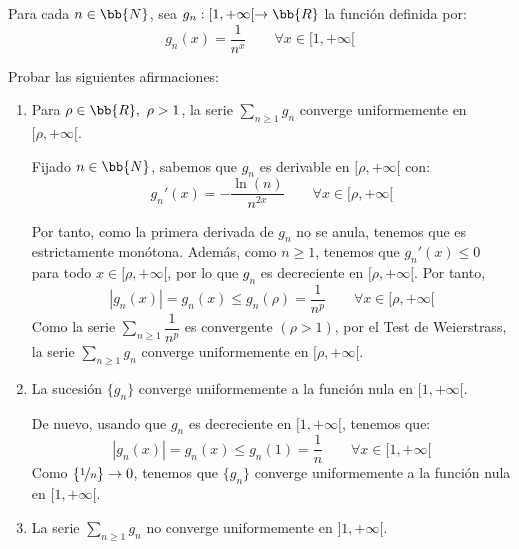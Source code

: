 \begin{ejercicio}
    Para cada $n\in \bb{N}$, sea $g_n:[1, +\infty[ \to\bb{R}$ la función definida por:
    \begin{equation*}
        g_n(x) = \frac{1}{n^x} \qquad \forall x\in[1, +\infty[
    \end{equation*}

    Probar las siguientes afirmaciones:
    \begin{enumerate}
        \item Para $\rho \in \bb{R},~\rho > 1$, la serie $\sum\limits_{n\geq 1}g_n$ converge uniformemente en $[\rho, +\infty[$.
        
        Fijado $n\in \bb{N}$, sabemos que $g_n$ es derivable en $[\rho, +\infty[$ con:
        \begin{equation*}
            g_n'(x) = -\frac{\ln(n)}{n^{2x}} \qquad \forall x\in[\rho, +\infty[
        \end{equation*}

        Por tanto, como la primera derivada de $g_n$ no se anula, tenemos que es estrictamente monótona. Además,
        como $n\geq 1$, tenemos que $g_n'(x) \leq 0$ para todo $x\in[\rho, +\infty[$, por lo que $g_n$ es decreciente en $[\rho, +\infty[$. Por tanto,
        \begin{equation*}
            |g_n(x)| = g_n(x) \leq g_n(\rho) = \frac{1}{n^p} \qquad \forall x\in[\rho, +\infty[
        \end{equation*}
        Como la serie $\sum\limits_{n\geq 1}\dfrac{1}{n^p}$ es convergente $\left(\rho > 1\right)$, por el Test de Weierstrass, la serie $\sum\limits_{n\geq 1}g_n$ converge uniformemente en $[\rho, +\infty[$.
        
        \item La sucesión $\{g_n\}$ converge uniformemente a la función nula en $[1, +\infty[$.
        
        De nuevo, usando que $g_n$ es decreciente en $[1, +\infty[$, tenemos que:
        \begin{equation*}
            |g_n(x)| = g_n(x) \leq g_n(1) = \frac{1}{n} \qquad \forall x\in[1, +\infty[
        \end{equation*}
        Como $\left\{\nicefrac{1}{n}\right\}\to 0$, tenemos que $\{g_n\}$ converge uniformemente a la función nula en $[1, +\infty[$.

        \item La serie $\sum\limits_{n\geq 1}g_n$ no converge uniformemente en $]1, +\infty[$.
        

\end{enumerate}
\end{ejercicio}
